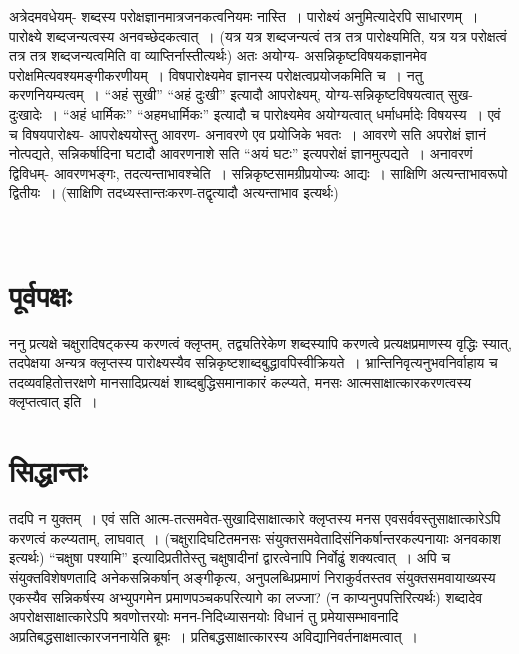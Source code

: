 {अत्रेदमवधेयम्- शब्दस्य परोक्षज्ञानमात्रजनकत्वनियमः नास्ति~। पारोक्ष्यं अनुमित्या\-देरपि साधारणम्~। पारोक्ष्ये शब्दजन्यत्वस्य अनवच्छेदकत्वात्~। (यत्र यत्र शब्दजन्यत्वं तत्र तत्र पारोक्ष्यमिति, यत्र यत्र परोक्षत्वं तत्र तत्र शब्दजन्यत्वमिति वा व्याप्तिर्नास्तीत्यर्थः) अतः अयोग्य- असन्निकृष्टविषयकज्ञानमेव परोक्षमित्यवश्यमङ्गीकरणीयम्~। विषपारोक्ष्यमेव ज्ञानस्य परोक्षत्वप्रयोजकमिति च~। नतु करणनियम्यत्वम्~। “अहं सुखी” “अहं दुःखी” इत्यादौ आपरोक्ष्यम्, योग्य-सन्निकृष्टविषयत्वात् सुख-दुःखादेः~। “अहं धार्मिकः” “अहमधार्मिकः” इत्यादौ च पारोक्ष्यमेव अयोग्यत्वात् धर्माधर्मादेः विषयस्य~। एवं च विषयपारोक्ष्य- आपरोक्ष्ययोस्तु आवरण- अनावरणे एव प्रयोजिके भवतः~। आवरणे सति अपरोक्षं ज्ञानं नोत्पद्यते, सन्निकर्षादिना घटादौ आवरणनाशे सति “अयं घटः” इत्यपरोक्षं ज्ञानमुत्पद्यते~। अनावरणं द्विविधम्- आवरणभङ्गः, तदत्यन्ताभावश्चेति~। सन्निकृष्टसामग्रीप्रयोज्यः आद्यः~। साक्षिणि अत्यन्ताभावरूपो द्वितीयः~। (साक्षिणि तदध्यस्तान्तःकरण-तद्वृत्यादौ अत्यन्ताभाव इत्यर्थः)

~\\[-1.7cm]

\section*{पूर्वपक्षः}

ननु प्रत्यक्षे चक्षुरादिषट्कस्य करणत्वं क्लृप्तम्, तद्व्यतिरेकेण शब्दस्यापि करणत्वे प्रत्यक्ष\-प्रमाणस्य वृद्धिः स्यात्, तदपेक्षया अन्यत्र क्लृप्तस्य पारोक्ष्यस्यैव सन्निकृष्टशाब्दबुद्धावपि\break स्वीक्रियते~। भ्रान्तिनिवृत्यनुभवनिर्वाहाय च तदव्यवहितोत्तरक्षणे मानसादिप्रत्यक्षं शाब्दबुद्धिसमानाकारं कल्प्यते, मनसः आत्मसाक्षात्कारकरणत्वस्य क्लृप्तत्वात् इति~। 

\section*{सिद्धान्तः}
\vskip -3pt

तदपि न युक्तम्~। एवं सति आत्म-तत्समवेत-सुखादिसाक्षात्कारे क्लृप्तस्य मनस एव\break सर्ववस्तुसाक्षात्कारेऽपि करणत्वं कल्प्यताम्, लाघवात्~। (चक्षुरादिघटितमनसः संयुक्तसम\-वेतादिसंनिकर्षान्तरकल्पनायाः अनवकाश इत्यर्थः) “चक्षुषा पश्यामि” इत्यादिप्रतीतेस्तु चक्षुषादीनां द्वारत्वेनापि निर्वोढुं शक्यत्वात्~। अपि च संयुक्तविशेषणतादि अनेकसन्निकर्षान् अङ्गीकृत्य, अनुपलब्धिप्रमाणं निराकुर्वतस्तव संयुक्तसमवायाख्यस्य एकस्यैव सन्निकर्षस्य अभ्युपगमेन प्रमाणपञ्चकपरित्यागे का लज्जा? (न काप्यनुपपत्तिरित्यर्थः) शब्दादेव अपरोक्षसाक्षात्कारेऽपि श्रवणोत्तरयोः मनन-निदिध्यासनयोः विधानं तु प्रमेयासम्भावनादि अप्रतिबद्धसाक्षात्कारजननायेति ब्रूमः~। प्रतिबद्धसाक्षात्कारस्य अविद्यानिवर्तनाक्षमत्वात्~। 

}
